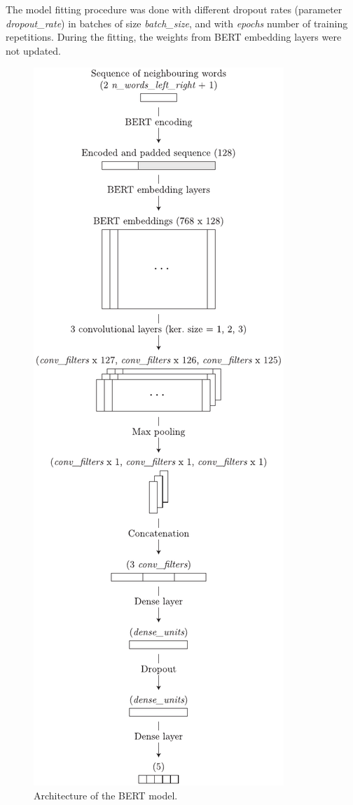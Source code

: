 \documentclass[11pt,a4paper]{article}
\begin{document}
The model fitting procedure was done with different dropout rates (parameter \textit{dropout\_rate}) in batches of size \textit{batch\_size}, and with \textit{epochs} number of training repetitions.
During the fitting, the weights from BERT embedding layers were not updated.

\begin{figure}[]
\centering
\includegraphics[width=1.0\columnwidth]{bert-model.pdf}
\caption{Architecture of the BERT model.}
\label{fig:bert-model}
\end{figure}
\end{document}
